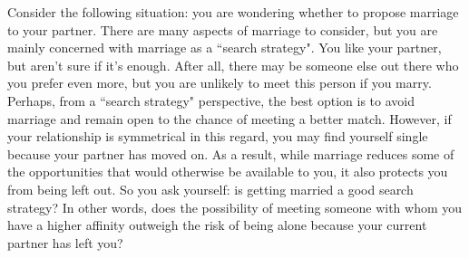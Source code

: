 \documentclass[12pt]{article}
\begin{document}
Consider the following situation: you are wondering whether to propose marriage to your partner. There are many aspects of marriage to consider, but you are mainly concerned with marriage as a ``search strategy". You like your partner, but aren't sure if it's enough. After all, there may be someone else out there who you prefer even more, but you are unlikely to meet this person if you marry. Perhaps, from a ``search strategy" perspective,  the best option is to avoid marriage and remain open to the chance of meeting a better match. However, if your relationship is symmetrical in this regard, you may find yourself single because your partner has moved on. As a result, while marriage reduces some of the opportunities that would otherwise be available to you, it also protects you from being left out. So you ask yourself: is getting married a good search strategy? In other words, does the possibility of meeting someone with whom you have a higher affinity outweigh the risk of being alone because your current partner has left you?
\end{document}
